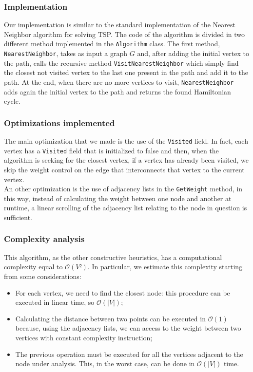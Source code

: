 \subsubsection{Implementation}
Our implementation is similar to the standard implementation of the Nearest Neighbor algorithm for solving TSP. The code of the algorithm is divided in two different method implemented in the \verb|Algorithm| class.
The first method, \verb|NearestNeighbor|, takes as input a graph $G$ and, after adding the initial vertex to the path, calls the recursive method \verb|VisitNearestNeighbor| which simply find the closest not visited vertex to the last one present in the path and add it to the path. At the end, when there are no more vertices to visit, \verb|NearestNeighbor| adds again the initial vertex to the path and returns the found Hamiltonian cycle.

\subsubsection{Optimizations implemented}
The main optimization that we made is the use of the \verb|Visited| field. In fact, each vertex has a \verb|Visited| field that is initialized to false and then, when the algorithm is seeking for the closest vertex, if a vertex has already been visited, we skip the weight control on the edge that interconnects that vertex to the current vertex. \\
An other optimization is the use of adjacency lists in the \verb|GetWeight| method, in this way, instead of calculating the weight between one node and another at runtime, a linear scrolling of the adjacency list relating to the node in question is sufficient.

\subsubsection{Complexity analysis}
This algorithm, as the other constructive heuristics, has a computational complexity equal to $\mathcal{O}(V²)$. In particular, we estimate this complexity starting from some considerations:
\begin{itemize}
    \item For each vertex, we need to find the closest node: this procedure can be executed in linear time, so $\mathcal{O}(|V|)$;
    \item Calculating the distance between two points can be executed in $\mathcal{O}(1)$ because, using the adjacency lists, we can access to the weight between two vertices with constant complexity instruction;
    \item The previous operation must be executed for all the vertices adjacent to the node under analysis. This, in the worst case, can be done in $\mathcal{O}(|V|)$ time.
\end{itemize}

